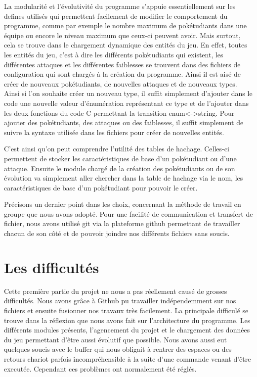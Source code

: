 \documentclass[10pt,a4paper,twocolumn]{report}
\begin{document}
La modularité et l'évolutivité du programme s'appuie essentiellement sur les defines utilisés qui permettent facilement de modifier le comportement du programme, comme par exemple le nombre maximum de pokétudiants dans une équipe ou encore le niveau maximum que ceux-ci peuvent avoir.
Mais surtout, cela se trouve dans le chargement dynamique des entités du jeu.
En effet, toutes les entités du jeu, c'est à dire les différents pokétudiants qui existent, les différentes attaques et les différentes faiblesses se trouvent dans des fichiers de configuration qui sont chargés à la création du programme. Ainsi il est aisé de créer de nouveaux pokétudiants, de nouvelles attaques et de nouveaux types.
Ainsi si l'on souhaite créer un nouveau type, il suffit simplement d'ajouter dans le code une nouvelle valeur d'énumération représentant ce type et de l'ajouter dans les deux fonctions du code C permettant la transition enum<->string.
Pour ajouter des pokétudiants, des attaques ou des faiblesses, il suffit simplement de suivre la syntaxe utilisée dans les fichiers pour créer de nouvelles entités.

C'est ainsi qu'on peut comprendre l'utilité des tables de hachage. Celles-ci permettent de stocker les caractéristiques de base d'un pokétudiant ou d'une attaque. Ensuite le module chargé de la création des pokétudiants ou de son évolution va simplement aller chercher dans la table de hachage via le nom, les caractéristiques de base d'un pokétudiant pour pouvoir le créer.

Précisons un dernier point dans les choix, concernant la méthode de travail en groupe que nous avons adopté. Pour une facilité de communication et transfert de fichier, nous avons utilisé git via la plateforme github permettant de travailler chacun de son côté et de pouvoir joindre nos différents fichiers sans soucis.

\section{Les difficultés}

Cette première partie du projet ne nous a pas réellement causé de grosses difficultés. Nous avons grâce à Github pu travailler indépendemment sur nos fichiers et ensuite fusionner nos travaux très facilement.
La principale difficulé se trouve dans la réflexion que nous avons fait sur l'architecture du programme. Les différents modules présents, l'agencement du projet et le chargement des données du jeu permettant d'être aussi évolutif que possible.
Nous avons aussi eut quelques soucis avec le buffer qui nous obligait à rentrer des espaces ou des retours chariot parfois incompréhensible à la suite d'une commande venant d'être executée. Cependant ces problèmes ont normalement été réglés.
\end{document}
